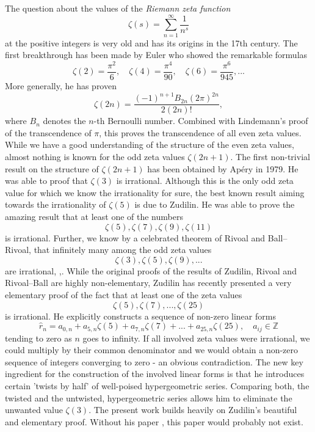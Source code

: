 \documentclass[11pt]{amsart}
\theoremstyle{plain}
\theoremstyle{remark}
\theoremstyle{definition}
\newcommand{\ZZ}{\mathbb{Z}}
\begin{document}
\maketitle
The question about the values of the \emph{Riemann zeta function} 
\[
	\zeta(s)=\sum_{n=1}^\infty \frac{1}{n^s}
\]
at the positive integers is very old and has its origins in the 17th century. The first breakthrough has been made by Euler who showed the remarkable formulas
\[
	\zeta(2)=\frac{\pi^2}{6},\quad \zeta(4)=\frac{\pi^4}{90},\quad \zeta(6)=\frac{\pi^6}{945}, ...
\]
More generally, he has proven
\[
	\zeta(2n)=\frac{(-1)^{n+1}B_{2n}(2\pi)^{2n}}{2(2n)!},
\]
where $B_n$ denotes the $n$-th Bernoulli number. Combined with Lindemann's proof of the transcendence of $\pi$, this proves the transcendence of all even zeta values. While we have a good understanding of the structure of the even zeta values, almost nothing is known for the odd zeta values $\zeta(2n+1)$. The first non-trivial result on the structure of $\zeta(2n+1)$ has been obtained by Ap\'ery in 1979. He was able to proof that $\zeta(3)$ is irrational. Although this is the only odd zeta value for which we know the irrationality for sure, the best known result aiming towards the irrationality of $\zeta(5)$ is due to Zudilin. He was able to prove the amazing result that at least one of the numbers
\[
	\zeta(5),\zeta(7),\zeta(9),\zeta(11)
\]
is irrational. Further, we know by a celebrated theorem of Rivoal and Ball--Rivoal, that infinitely many among the odd zeta values
\[
	\zeta(3),\zeta(5),\zeta(9),...
\]
are irrational, \cite{rivoal},\cite{ball_rivoal}. While the original proofs of the results of Zudilin, Rivoal and Rivoal--Ball are highly non-elementary, Zudilin has recently presented a very elementary proof of the fact that at least one of the zeta values
\[
	\zeta(5),\zeta(7),...,\zeta(25)
\]
is irrational. He explicitly constructs a sequence of non-zero linear forms
\[
	\hat{r}_n=a_{0,n}+a_{5,n}\zeta(5)+a_{7,n}\zeta(7)+...+a_{25,n}\zeta(25),\quad a_{ij}\in\ZZ
\]
tending to zero as $n$ goes to infinity. If all involved zeta values were irrational, we could multiply by their common denominator and we would obtain a non-zero sequence of integers converging to zero - an obvious contradiction. The new key ingredient for the construction of the involved linear forms is that he introduces certain 'twists by half' of well-poised hypergeometric series. Comparing both, the twisted and the untwisted, hypergeometric series allows him to eliminate the unwanted value $\zeta(3)$. The present work builds heavily on Zudilin's beautiful and elementary proof. Without his paper \cite{zudilin}, this paper would probably not exist.\par 
\end{document}
